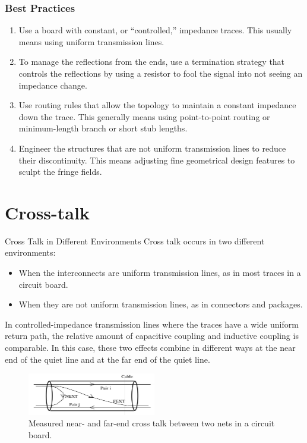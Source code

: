 \documentclass[10pt,hyperref={pdfpagemode=FullScreen},aspectratio=169]{beamer}
\begin{document}
\begin{frame}
  \frametitle{Best Practices}

  \begin{enumerate}
    \item Use a board with constant, or “controlled,”
    impedance traces. This usually means using uniform
    transmission lines.
    \item To manage the reflections from the ends, use a
    termination strategy that controls the reflections by
    using a resistor to fool the signal into not seeing an
    impedance change.
    \item Use routing rules that allow the topology to
    maintain a constant impedance down the trace. This
    generally means using point-to-point routing or
    minimum-length branch or short stub lengths.
    \item Engineer the structures that are not uniform
    transmission lines to reduce their discontinuity.
    This means adjusting fine geometrical design
    features to sculpt the fringe fields.
  \end{enumerate}


\end{frame}


\section{Cross-talk}

\begin{frame}{Cross Talk in Different Environments}
  Cross talk occurs in two different environments:
  \begin{itemize}
    \item When the interconnects are uniform transmission lines, as in most traces in a circuit board.
    \item When they are not uniform transmission lines, as in connectors and packages.
  \end{itemize}
  In controlled-impedance transmission lines where the traces have a wide uniform return path, the relative amount of capacitive coupling and inductive coupling is comparable. In this case, these two effects combine in different ways at the near end of the quiet line and at the far end of the quiet line.

  \begin{figure}
    \centering
    \includegraphics[width=0.5\textwidth]{Fig/near_far.png}
    \caption{Measured near- and far-end cross talk between two nets in a circuit board.}
  \end{figure}

\end{frame}
  
\end{document}

